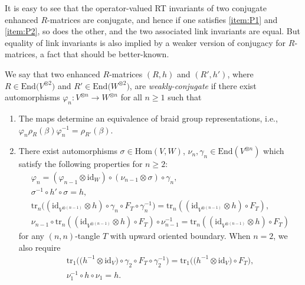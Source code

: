 \documentclass[10pt,a4paper]{amsart}
\makeatletter
\numberwithin{equation}{section}
\theoremstyle{definition}
\def\namedlabel#1#2{\begingroup
 #2%
 \def\@currentlabel{#2}%
 \phantomsection\label{#1}\endgroup
}
\makeatother
\begin{document}
It is easy to see that the operator-valued RT invariants of two conjugate
enhanced $R$-matrices are conjugate, and hence if one satisfies \eqref{item:P1}
and \eqref{item:P2},
so does the other, and the two associated link invariants are equal.
But equality of link invariants is also implied by a weaker version of conjugacy
for $R$-matrices, a fact that should be better-known.

We say that two enhanced $R$-matrices $(R,h)$ and $(R',h')$, where
$R \in \mathrm{End}\bigl(V^{\otimes 2}\bigr)$ and $R' \in \mathrm{End}\bigl(W^{\otimes 2}\bigr)$, are
\emph{weakly-conjugate} if there exist automorphisms
$\varphi_n\colon V^{\otimes n}\to W^{\otimes n}$ for all $n\geq 1$ such that
\begin{enumerate}\itemsep=0pt \setlength{\leftskip}{0.26cm}
\item[(\namedlabel{item:BC1}{$BC_1$})]
 The maps determine an equivalence of braid group representations, i.e.,
$\varphi_n \rho_R(\beta) \varphi_n^{-1}= \rho_{R'}(\beta)$.
\item[(\namedlabel{item:BC2}{$BC_2$})]
 There exist automorphisms $\sigma \in \mathrm{Hom}(V,W)$, $\nu_{n},\gamma_n\in \mathrm{End}(V^{\otimes n})$
 which satisfy the following properties for $n\geq 2$:
\begin{gather}
 \varphi_n=(\varphi_{n-1}\otimes \mathrm{id}_W)\circ (\nu_{n-1} \otimes \sigma)\circ\gamma_n,
 \label{eq.phin}
 \\
 \sigma^{-1} \circ h' \circ\sigma = h, \label{eq.sn}
 \\
 \mathrm{tr}_n\bigl((\mathrm{id}_{V^{\otimes (n-1)}}\otimes h)\circ \gamma_n\circ F_T\circ \gamma_n^{-1}\bigr)
 =\mathrm{tr}_n((\mathrm{id}_{V^{\otimes (n-1)}}\otimes h)\circ F_T),\label{eq.gn}
 \\
 \nu_{n-1} \circ \mathrm{tr}_n((\mathrm{id}_{V^{\otimes (n-1)}}\otimes h)\circ F_T)\circ \nu_{n-1}^{-1}
 =\mathrm{tr}_n((\mathrm{id}_{V^{\otimes (n-1)}}\otimes h)\circ F_T)\label{eq.nun}
\end{gather}
for any $(n,n)$-tangle $T$ with upward oriented boundary. When $n=2$, we also require
\begin{gather}
 \mathrm{tr}_1\bigl(\bigl(h^{-1}\otimes\mathrm{id}_V\bigr)\circ \gamma_2\circ F_T\circ \gamma_2^{-1}\bigr)
 =
 \mathrm{tr}_1\bigl(\bigl(h^{-1}\otimes\mathrm{id}_V\bigr)\circ F_T\bigr), \label{eq.g2}
 \\
 \nu_1^{-1} \circ h \circ \nu_1=h .\label{eq.n1}
\end{gather}
\end{enumerate}
\end{document}
